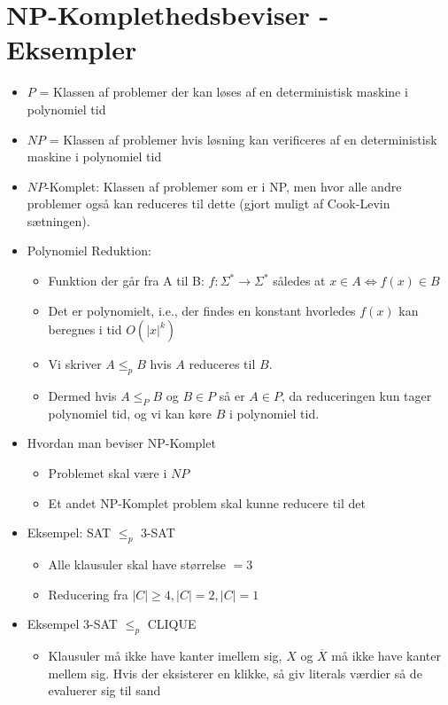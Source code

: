 \newpage

\section*{NP-Komplethedsbeviser - Eksempler}

\begin{itemize}
	\item $P$ = Klassen af problemer der kan løses af en deterministisk maskine i polynomiel tid
	\item $NP$ = Klassen af problemer hvis løsning kan verificeres af en deterministisk maskine i polynomiel tid
	\item $NP$-Komplet: Klassen af problemer som er i NP, men hvor alle andre problemer også kan reduceres til dette (gjort muligt af Cook-Levin sætningen).
	\item Polynomiel Reduktion:
	      \begin{itemize}
		      \item Funktion der går fra A til B:  $f : \Sigma^{*} \rightarrow \Sigma^{*}$ således at $x \in A \iff f(x) \in B$
		      \item Det er polynomielt, i.e., der findes en konstant hvorledes $f(x)$ kan beregnes i tid $O(|x|^{k})$
		      \item Vi skriver $A \le_{p} B$ hvis $A$ reduceres til $B$.
		      \item Dermed hvis $A \le_{P} B$ og $B \in P$ så er $A \in P$, da reduceringen kun tager polynomiel tid, og vi kan køre $B$ i polynomiel tid.
	      \end{itemize}
	\item Hvordan man beviser NP-Komplet
	      \begin{itemize}
		      \item Problemet skal være i $NP$
		      \item Et andet NP-Komplet problem skal kunne reducere til det
	      \end{itemize}
	\item Eksempel: SAT $\le_{p}$ 3-SAT
	      \begin{itemize}
		      \item Alle klausuler skal have størrelse $= 3$
		      \item Reducering fra $|C| \ge 4, |C| = 2, |C| = 1$
	      \end{itemize}
	\item Eksempel 3-SAT $\le_{p}$ CLIQUE
	      \begin{itemize}
		      \item Klausuler må ikke have kanter imellem sig, $X$ og $\overline{X}$ må ikke have kanter mellem sig. Hvis der eksisterer en klikke, så giv literals værdier så de evaluerer sig til sand

\end{itemize}
\end{itemize}

